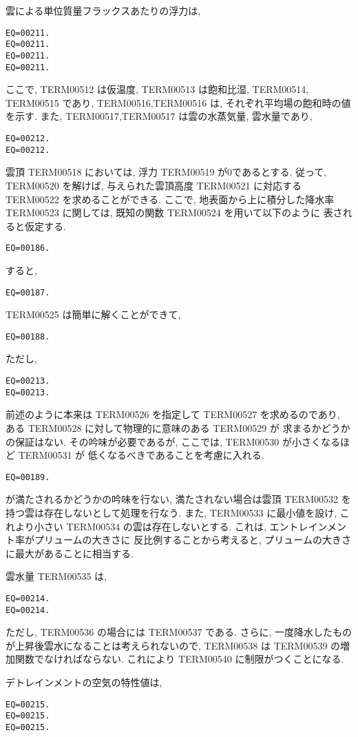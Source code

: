 雲による単位質量フラックスあたりの浮力は,
\begin{verbatim}
EQ=00211.
EQ=00211.
EQ=00211.
EQ=00211.
\end{verbatim}
ここで, TERM00512 は仮温度, TERM00513 は飽和比湿,
TERM00514,
TERM00515 であり,
TERM00516,TERM00516 は, それぞれ平均場の飽和時の値を示す.
また, TERM00517,TERM00517 は雲の水蒸気量, 雲水量であり,
\begin{verbatim}
EQ=00212.
EQ=00212.
\end{verbatim}
雲頂 TERM00518 においては, 浮力 TERM00519 が0であるとする.
従って, TERM00520 を解けば, 与えられた雲頂高度 TERM00521 に対応する
TERM00522 を求めることができる.
ここで, 地表面から上に積分した降水率 TERM00523 に関しては, 
既知の関数 TERM00524 を用いて以下のように
表されると仮定する. 
\begin{verbatim}
EQ=00186.
\end{verbatim}
すると, 
\begin{verbatim}
EQ=00187.
\end{verbatim}

TERM00525 は簡単に解くことができて,
\begin{verbatim}
EQ=00188.
\end{verbatim}
ただし, 
\begin{verbatim}
EQ=00213.
EQ=00213.
\end{verbatim}

前述のように本来は TERM00526 を指定して TERM00527 を求めるのであり,
ある TERM00528 に対して物理的に意味のある TERM00529 が
求まるかどうかの保証はない. 
その吟味が必要であるが, ここでは,
TERM00530 が小さくなるほど TERM00531 が
低くなるべきであることを考慮に入れる.
\begin{verbatim}
EQ=00189.
\end{verbatim}
が満たされるかどうかの吟味を行ない,
満たされない場合は雲頂 TERM00532 を持つ雲は存在しないとして処理を行なう.
また, TERM00533 に最小値を設け, 
これより小さい TERM00534 の雲は存在しないとする.
これは, エントレインメント率がプリュームの大きさに
反比例することから考えると, 
プリュームの大きさに最大があることに相当する.

雲水量 TERM00535 は,
\begin{verbatim}
EQ=00214.
EQ=00214.
\end{verbatim}
ただし, TERM00536 の場合には TERM00537 である.
さらに, 一度降水したものが上昇後雲水になることは考えられないので,
TERM00538 は TERM00539 の増加関数でなければならない.
これにより TERM00540 に制限がつくことになる.

デトレインメントの空気の特性値は,
\begin{verbatim}
EQ=00215.
EQ=00215.
EQ=00215.
\end{verbatim}

